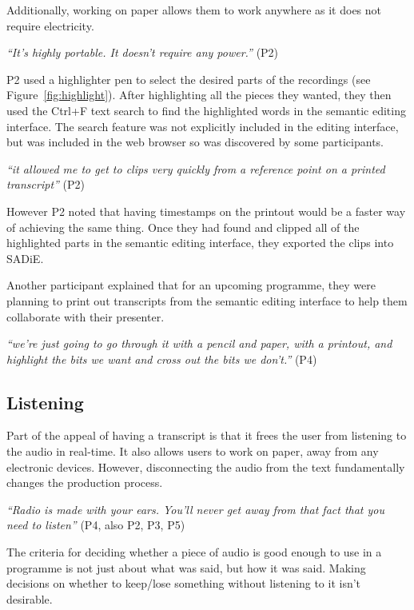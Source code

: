 
Additionally, working on paper allows them to work anywhere as it does not require electricity.

\textit{``It's highly portable. It doesn't require any power.''} (P2)

P2 used a highlighter pen to select the desired parts of the recordings (see Figure~\ref{fig:highlight}).  After
highlighting all the pieces they wanted, they then used the Ctrl+F text search to find the highlighted words in the
semantic editing interface.  The search feature was not explicitly included in the editing interface, but was included
in the web browser so was discovered by some participants.

\textit{``it allowed me to get to clips very quickly from a reference point on a printed transcript''} (P2)

However P2 noted that having timestamps on the printout would be a faster way of achieving the same thing.  Once they
had found and clipped all of the highlighted parts in the semantic editing interface, they exported the clips into
SADiE.

Another participant explained that for an upcoming programme, they were planning to print out transcripts from the
semantic editing interface to help them collaborate with their presenter.

\textit{``we're just going to go through it with a pencil and paper, with a printout, and highlight the bits we want
  and cross out the bits we don't.''} (P4)

\subsection{Listening}
Part of the appeal of having a transcript is that it frees the user from listening to the audio in real-time. It also
allows users to work on paper, away from any electronic devices. However, disconnecting the audio from the text
fundamentally changes the production process.

\textit{``Radio is made with your ears. You'll never get away from that fact that you need to listen''} (P4, also P2,
P3, P5)

The criteria for deciding whether a piece of audio is good enough to use in a programme is not just about what was
said, but how it was said. Making decisions on whether to keep/lose something without listening to it isn't desirable.

